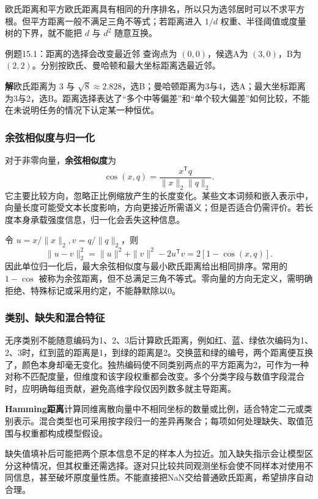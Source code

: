 \documentclass[UTF8,fontset=none,zihao=-4,a4paper]{ctexart}
\newcommand{\term}[1]{\textbf{#1}}
\newcommand{\sol}{\par\noindent\textbf{解}\quad}
\numberwithin{equation}{section}
\numberwithin{figure}{section}
\begin{document}
欧氏距离和平方欧氏距离具有相同的升序排名，所以只为选邻居时可以不求平方根。但平方距离一般不满足三角不等式；若距离进入 $1/d$ 权重、半径阈值或度量树的下界，就不能把 $d$ 与 $d^2$ 随意互换。

\begin{infobox}[unbreakable]{例题15.1：距离的选择会改变最近邻}
查询点为 $(0,0)$，候选A为 $(3,0)$，B为 $(2,2)$。分别按欧氏、曼哈顿和最大坐标距离选最近邻。
\sol 欧氏距离为 $3$ 与 $\sqrt8\approx2.828$，选B；曼哈顿距离为3与4，选A；最大坐标距离为3与2，选B。距离选择表达了“多个中等偏差”和“单个较大偏差”如何比较，不能在未说明任务的情况下认定某一种恒优。
\end{infobox}

\subsubsection{余弦相似度与归一化}
对于非零向量，\term{余弦相似度}为
\[
 \operatorname{cos}(x,q)=\frac{x^{\mathsf T}q}{\|x\|_2\|q\|_2}.
\]
它主要比较方向，忽略正比例缩放产生的长度变化。某些文本词频和嵌入表示中，向量长度可能受文本长度影响，方向更接近所需语义；但是否适合仍需评价。若长度本身承载强度信息，归一化会丢失这种信息。

令 $u=x/\|x\|_2,v=q/\|q\|_2$，则
\[
 \|u-v\|_2^2=\|u\|^2+\|v\|^2-2u^{\mathsf T}v
 =2[1-\operatorname{cos}(x,q)].
\]
因此单位归一化后，最大余弦相似度与最小欧氏距离给出相同排序。常用的 $1-\operatorname{cos}$ 被称为余弦距离，但不总满足三角不等式。零向量的方向无定义，需明确拒绝、特殊标记或采用约定，不能静默除以0。

\subsubsection{类别、缺失和混合特征}
无序类别不能随意编码为1、2、3后计算欧氏距离，例如红、蓝、绿依次编码为1、2、3时，红到蓝的距离是1，到绿的距离是2。交换蓝和绿的编号，两个距离便互换了，颜色本身却毫无变化。独热编码使不同类别两点的平方距离为2，可作为一种对称不匹配度量，但维度和该字段权重都会改变。多个分类字段与数值字段混合时，应明确每组贡献，避免高维字段仅因列数多就主导距离。

\term{Hamming距离}计算同维离散向量中不相同坐标的数量或比例，适合特定二元或类别表示。混合类型也可采用按字段归一的差异再聚合；每项如何处理缺失、取值范围与权重都构成模型假设。

缺失值填补后可能把两个原本信息不足的样本人为拉近。加入缺失指示会让模型区分这种情况，但其权重还需选择。逐对只比较共同观测坐标会使不同样本对使用不同信息，甚至破坏原度量性质。不能直接把NaN交给普通欧氏距离，希望排序自动合理。
\end{document}
